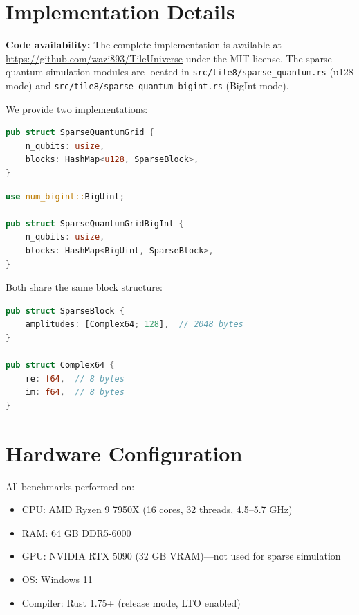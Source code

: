 \documentclass[11pt,twocolumn]{article}
\begin{document}

\appendix

\section{Implementation Details}

\textbf{Code availability:} The complete implementation is available at \url{https://github.com/wazi893/TileUniverse} under the MIT license. The sparse quantum simulation modules are located in \texttt{src/tile8/sparse\_quantum.rs} (u128 mode) and \texttt{src/tile8/sparse\_quantum\_bigint.rs} (BigInt mode).

We provide two implementations:

\begin{lstlisting}[language=Rust,caption={u128 mode (up to 135 qubits)}]
pub struct SparseQuantumGrid {
    n_qubits: usize,
    blocks: HashMap<u128, SparseBlock>,
}
\end{lstlisting}

\begin{lstlisting}[language=Rust,caption={BigInt mode (unlimited qubits)}]
use num_bigint::BigUint;

pub struct SparseQuantumGridBigInt {
    n_qubits: usize,
    blocks: HashMap<BigUint, SparseBlock>,
}
\end{lstlisting}

Both share the same block structure:

\begin{lstlisting}[language=Rust,caption={Sparse block with f64 precision}]
pub struct SparseBlock {
    amplitudes: [Complex64; 128],  // 2048 bytes
}

pub struct Complex64 {
    re: f64,  // 8 bytes
    im: f64,  // 8 bytes
}
\end{lstlisting}

\section{Hardware Configuration}

All benchmarks performed on:
\begin{itemize}
    \item CPU: AMD Ryzen 9 7950X (16 cores, 32 threads, 4.5--5.7 GHz)
    \item RAM: 64 GB DDR5-6000
    \item GPU: NVIDIA RTX 5090 (32 GB VRAM)---not used for sparse simulation
    \item OS: Windows 11
    \item Compiler: Rust 1.75+ (release mode, LTO enabled)
\end{itemize}
\end{document}
